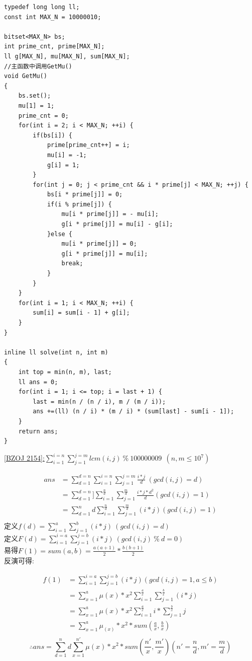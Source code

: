 \begin{lstlisting}
typedef long long ll;
const int MAX_N = 10000010;

bitset<MAX_N> bs;
int prime_cnt, prime[MAX_N];
ll g[MAX_N], mu[MAX_N], sum[MAX_N];
//主函数中调用GetMu()
void GetMu()
{
	bs.set();
	mu[1] = 1;
	prime_cnt = 0;
	for(int i = 2; i < MAX_N; ++i) {
		if(bs[i]) {
			prime[prime_cnt++] = i;
			mu[i] = -1;
			g[i] = 1;
		}
		for(int j = 0; j < prime_cnt && i * prime[j] < MAX_N; ++j) {
			bs[i * prime[j]] = 0;
			if(i % prime[j]) {
				mu[i * prime[j]] = - mu[i];
				g[i * prime[j]] = mu[i] - g[i];
			}else {
				mu[i * prime[j]] = 0;
				g[i * prime[j]] = mu[i];
				break;
			}
		}
	}
	for(int i = 1; i < MAX_N; ++i) {
		sum[i] = sum[i - 1] + g[i];
	}
}

inline ll solve(int n, int m)
{
	int top = min(n, m), last;
	ll ans = 0;
	for(int i = 1; i <= top; i = last + 1) {
		last = min(n / (n / i), m / (m / i));
		ans +=(ll) (n / i) * (m / i) * (sum[last] - sum[i - 1]);
	}
	return ans;
}
\end{lstlisting}

\underline {[BZOJ 2154]:$\sum_{i=1}^{i=n} \sum_{j=1}^{j=m}lcm(i,j)\ \%\ 100000009\  \ (n,m\leq 10^{7})$}

$$\begin{aligned}
ans &=\sum_{d=1}^{d=n}\sum_{i=1}^{i=n}\sum_{j=1}^{j=m}\frac{i*j}{d}\ (gcd(i,j)=d) \\
&=\sum_{d=1}^{d=n}]\sum_{i=1}^{\frac{n}{d}}\sum_{j=1}^{\frac{m}{d}}\frac{i*j*d^2}{d}(gcd(i,j)=1) \\
&=\sum_{d=1}^{n}d\sum_{i=1}^{\frac{n}{d}}\sum_{j=1}^{\frac{m}{d}}(i*j)(gcd(i,j)=1) \\
\end{aligned}$$
定义$f(d)=\sum_{i=1}^{a}\sum_{j=1}^{b}(i*j)\ (gcd(i,j)=d)$ \\
定义$F(d)=\sum_{i=1}^{i=a}\sum_{j=1}^{j=b}(i*j)\ (gcd(i,j)\ \%\ d=0)$ \\
易得$F(1)=sum(a,b)=\frac{a(a+1)}{2}*\frac{b(b+1)}{2}$ \\
反演可得:

$$\begin{aligned}
f(1)&=\sum_{i=1}^{i=a}\sum_{j=1}^{j=b}(i*j)(gcd(i,j)=1,a\leq b) \\
&=\sum_{x=1}^{a}\mu(x)*x^2\sum_{i=1}^{\frac{a}{x}}\sum_{j=1}^{\frac{b}{x}}(i*j) \\
&=\sum_{x=1}^{a}\mu(x)*x^2\sum_{i=1}^{\frac{a}{x}}i*\sum_{j=1}^{\frac{b}{x}}j \\
&=\sum_{x=1}^{a}\mu_(x)*x^2*sum(\frac{a}{x},\frac{b}{x}) \\
\end{aligned}$$
$$\therefore ans = \sum_{d=1}^{n}d\sum_{x=1}^{n'}\mu(x)*x^2*sum(\frac{n'}{x},\frac{m'}{x})(n'=\frac{n}{d},m'=\frac{m}{d})$$\\

